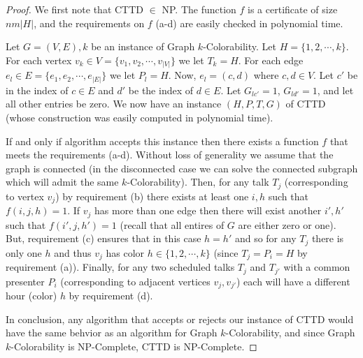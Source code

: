 \documentclass[]{article}
\theoremstyle{definition}
\theoremstyle{remark}
\numberwithin{equation}{section}
\begin{document}
\begin{proof}\label{cttd_np}
We first note that CTTD $\in$ NP. The function $f$ is a certificate of size $nm|H|$, and the requirements on $f$ (a-d) are easily checked in polynomial time.

Let $G=(V,E),k$ be an instance of Graph $k$-Colorability. Let $H=\{1, 2, \cdots, k\}$. For each vertex $v_k \in V=\{v_1, v_2, \cdots, v_{|V|}\}$ we let $T_k = H$. For each edge $e_l \in E=\{e_1, e_2, \cdots, e_{|E|}\}$ we let $P_l = H$. Now, $e_l = (c,d)$ where $c,d \in V$. Let $c'$ be in the index of $c \in E$ and $d'$ be the index of $d \in E$. Let $G_{lc'} = 1$, $G_{ld'} = 1$, and let all other entries be zero. We now have an instance $(H, P, T, G)$ of CTTD (whose construction was easily computed in polynomial time). 

If and only if algorithm accepts this instance then there exists a function $f$ that meets the requirements (a-d). Without loss of generality we assume that the graph is connected (in the disconnected case we can solve the connected subgraph which will admit the same $k$-Colorability). Then, for any talk $T_j$ (corresponding to vertex $v_j$)  by requirement (b) there exists at least one $i, h$ such that $f(i,j,h) = 1$. If $v_j$ has more than one edge then there will exist another $i',h'$ such that $f(i',j,h')=1$ (recall that all entires of $G$ are either zero or one). But, requirement (c) ensures that in this case $h=h'$ and so for any $T_j$ there is only one $h$ and thus $v_j$ has color $h \in \{1,2,\cdots,k\}$ (since $T_j=P_i=H$ by requirement (a)). Finally, for any two scheduled talks $T_j$ and $T_{j'}$ with a common presenter $P_i$ (corresponding to adjacent vertices $v_j, v_{j'}$) each will have a different hour (color) $h$ by requirement (d).

In conclusion, any algorithm that accepts or rejects our instance of CTTD would have the same behvior as an algorithm for Graph $k$-Colorability, and since Graph $k$-Colorability is NP-Complete, CTTD is NP-Complete.
\end{proof}
\end{document}
